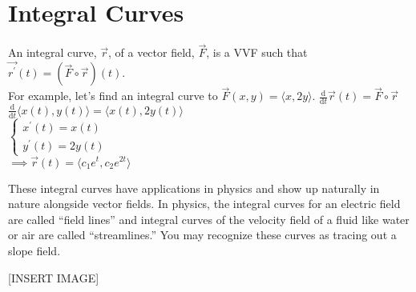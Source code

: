 \section{Integral Curves}
\noindent
An integral curve, $\vec{r}$, of a vector field, $\vec{F}$, is a VVF such that $\vec{r^\prime}(t) = \left(\vec{F}\circ\vec{r}\right)(t)$.\\

\noindent
For example, let's find an integral curve to $\vec{F}(x,y) = \langle x, 2y\rangle$.
\indent
$\frac{\mathrm{d}}{\mathrm{d}t}\vec{r}(t) = \vec{F}\circ\vec{r}$\\
\indent
$\frac{\mathrm{d}}{\mathrm{d}t}\langle x(t), y(t) \rangle = \langle x(t), 2 y(t) \rangle$\\
\indent
$\begin{cases}
	x^\prime(t) = x(t) \\
	y^\prime(t) = 2 y(t)
\end{cases}$\\
\indent
$\implies \vec{r}(t) = \langle c_1 e^t, c_2 e^{2t} \rangle$

\noindent
These integral curves have applications in physics and show up naturally in nature alongside vector fields. In physics, the integral curves for an electric field are called “field lines” and integral curves of the velocity field of a fluid like water or air are called “streamlines.” You may recognize these curves as tracing out a slope field.

[INSERT IMAGE]